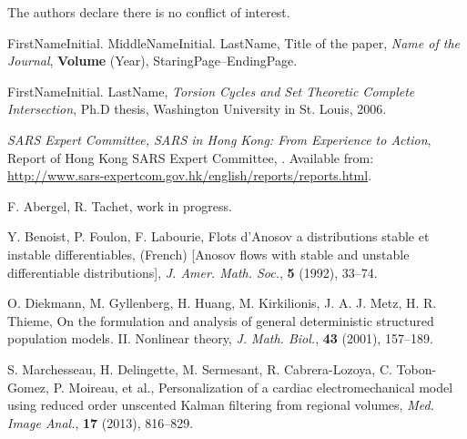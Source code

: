 \documentclass{aims}
\numberwithin{equation}{section}
\theoremstyle{definition}
\begin{document}
The authors declare there is no conflict of interest.

\begin{thebibliography}{99}


     \newblock  FirstNameInitial.  MiddleNameInitial. LastName, %
     \newblock Title of the paper,
     \newblock \emph{Name of the Journal}, \textbf{Volume} (Year), StaringPage--EndingPage.

    \newblock FirstNameInitial. LastName,
    \newblock  \emph{Torsion Cycles and Set Theoretic Complete Intersection},
    \newblock  Ph.D thesis, Washington University in St. Louis, 2006.

\emph{SARS Expert Committee, SARS in Hong Kong: From Experience to
Action}, Report of Hong Kong SARS Expert Committee,
. Available from: \url{http://www.sars-expertcom.gov.hk/english/reports/reports.html}.

\newblock F. Abergel, R. Tachet,
\newblock
\newblock work in progress.

    \newblock Y. Benoist, P. Foulon, F. Labourie, %
    \newblock Flots d'Anosov a distributions stable et instable
     differentiables,
    \newblock (French) [Anosov flows with stable and unstable differentiable
     distributions], \emph{J. Amer. Math. Soc.}, \textbf{5} (1992), 33--74.

\newblock  O. Diekmann, M. Gyllenberg, H. Huang, M. Kirkilionis, J. A. J. Metz, H. R. Thieme, 
\newblock On the formulation and analysis of general deterministic structured population models. II. Nonlinear theory, 
\emph{J. Math. Biol.}, \textbf{43} (2001), 157--189.

 S. Marchesseau, H. Delingette, M. Sermesant, R. Cabrera-Lozoya, C. Tobon-Gomez, P. Moireau, et al., 
\newblock Personalization of a cardiac electromechanical model using reduced order unscented Kalman filtering from regional volumes, \emph{Med. Image Anal.}, \textbf{17} (2013), 816--829.


\end{thebibliography}
\end{document}
